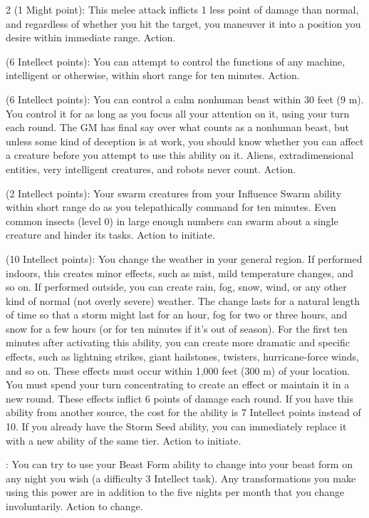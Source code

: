 \begin{multicols}{2}
 (1 Might point): This melee attack inflicts 1 less point of damage than normal, and regardless of whether you hit the target, you maneuver it into a position you desire within immediate range. Action. 

 (6 Intellect points): You can attempt to control the functions of any machine, intelligent or otherwise, within short range for ten minutes. Action.

 (6 Intellect points): You can control a calm nonhuman beast within 30 feet (9 m). You control it for as long as you focus all your attention on it, using your turn each round. The GM has final say over what counts as a nonhuman beast, but unless some kind of deception is at work, you should know whether you can affect a creature before you attempt to use this ability on it. Aliens, extradimensional entities, very intelligent creatures, and robots never count. Action. 

 (2 Intellect points): Your swarm creatures from your Influence Swarm ability within short range do as you telepathically command for ten minutes. Even common insects (level 0) in large enough numbers can swarm about a single creature and hinder its tasks. Action to initiate. 

 (10 Intellect points): You change the weather in your general region. If performed indoors, this creates minor effects, such as mist, mild temperature changes, and so on. If performed outside, you can create rain, fog, snow, wind, or any other kind of normal (not overly severe) weather. The change lasts for a natural length of time so that a storm might last for an hour, fog for two or three hours, and snow for a few hours (or for ten minutes if it’s out of season). For the first ten minutes after activating this ability, you can create more dramatic and specific effects, such as lightning strikes, giant hailstones, twisters, hurricane-force winds, and so on. These effects must occur within 1,000 feet (300 m) of your location. You must spend your turn concentrating to create an effect or maintain it in a new round. These effects inflict 6 points of damage each round. If you have this ability from another source, the cost for the ability is 7 Intellect points instead of 10. If you already have the Storm Seed ability, you can immediately replace it with a new ability of the same tier. Action to initiate.

: You can try to use your Beast Form ability to change into your beast form on any night you wish (a difficulty 3 Intellect task). Any transformations you make using this power are in addition to the five nights per month that you change involuntarily. Action to change. 


\end{multicols}
